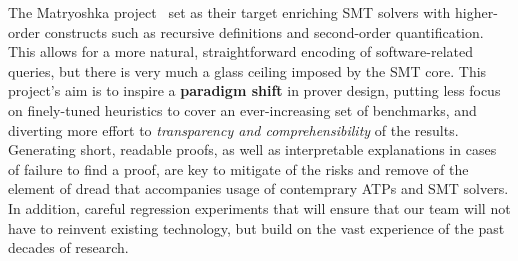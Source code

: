 The Matryoshka project~\cite{what} set as their target enriching SMT solvers with higher-order constructs such as recursive definitions and second-order quantification.
This allows for a more natural, straightforward encoding of software-related queries, but there is very much a glass ceiling imposed by the SMT core.
This project's aim is to inspire a \textbf{paradigm shift} in prover design, putting less focus on finely-tuned heuristics to cover an ever-increasing set of benchmarks, and diverting more effort to \emph{transparency and comprehensibility} of the results.
Generating short, readable proofs, as well as interpretable explanations in cases of failure to find a proof,
are key to mitigate of the risks and remove of the element of dread that accompanies usage of contemprary ATPs and SMT solvers.
In addition, careful regression experiments that will ensure that our team will not have to reinvent existing technology, but build on the vast experience of the past decades of research.